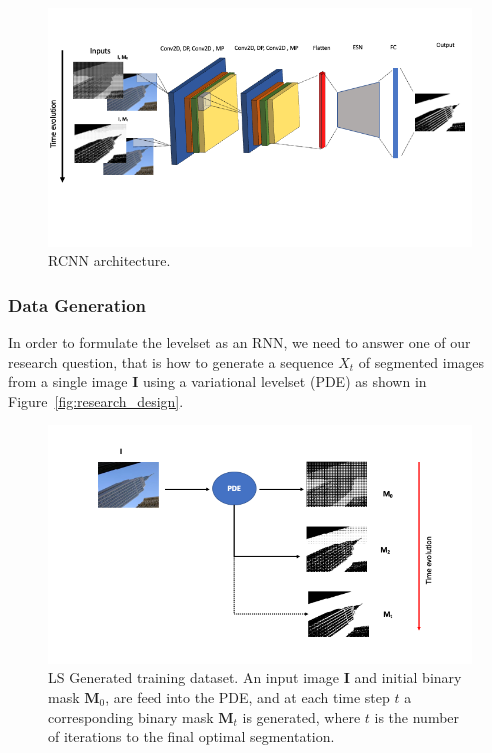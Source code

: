\documentclass{WitsPhysicsReport}
\begin{document}
\begin{figure}[H]
\centering
\includegraphics[width=1\textwidth]{Figure/CNN_LSTM.png}
\caption{RCNN architecture.}
\label{fig:ConvESN}
\end{figure}

\subsubsection{Data Generation}
\label{sec:data_generation}

In order to formulate the levelset as an RNN, we need to answer one of our research question, that is how to generate a sequence $X_{t}$ of segmented images from a single image $\mathbf{I}$ using a variational levelset (PDE) as shown in Figure~\ref{fig:research_design}.

\begin{figure}[H]
\centering
  \includegraphics[width=1\textwidth]{Figure/Results/PDE.png}
 \caption{LS Generated training dataset. An input image $\mathbf{I}$ and initial binary mask $\mathbf{M}_{0}$, are feed into the PDE, and at each time step $t$ a corresponding binary mask $\mathbf{M}_{t}$ is generated, where $t$ is the number of iterations to the final optimal segmentation.}
 \label{fig:sample_generated_data}
\end{figure}
\end{document}
